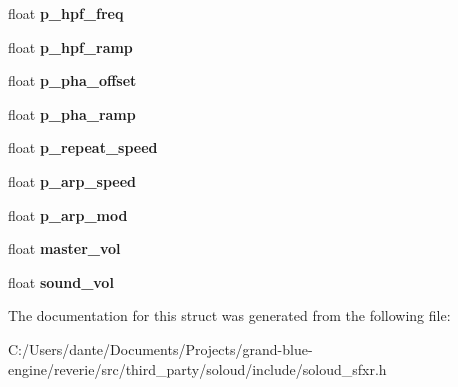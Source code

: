 \begin{DoxyCompactItemize}
float {\bfseries p\+\_\+hpf\+\_\+freq}
\item 
\mbox{\label{struct_so_loud_1_1_sfxr_params_ac6a93a91c96054caa661ca8a69849cd3}} 
float {\bfseries p\+\_\+hpf\+\_\+ramp}
\item 
\mbox{\label{struct_so_loud_1_1_sfxr_params_a77407eaea01a9729edd77601935ad630}} 
float {\bfseries p\+\_\+pha\+\_\+offset}
\item 
\mbox{\label{struct_so_loud_1_1_sfxr_params_aaa118d49465911a42896292d5dd9d38f}} 
float {\bfseries p\+\_\+pha\+\_\+ramp}
\item 
\mbox{\label{struct_so_loud_1_1_sfxr_params_a8e264eb463bb0d54278a7523e05f92c7}} 
float {\bfseries p\+\_\+repeat\+\_\+speed}
\item 
\mbox{\label{struct_so_loud_1_1_sfxr_params_a818682d30a2f7f185cd21d2e162dbad5}} 
float {\bfseries p\+\_\+arp\+\_\+speed}
\item 
\mbox{\label{struct_so_loud_1_1_sfxr_params_a0d98f475455a59d71a3aed2092a646e5}} 
float {\bfseries p\+\_\+arp\+\_\+mod}
\item 
\mbox{\label{struct_so_loud_1_1_sfxr_params_a914028741afd880475085953ae2872a3}} 
float {\bfseries master\+\_\+vol}
\item 
\mbox{\label{struct_so_loud_1_1_sfxr_params_aa0ed234579b29fa59b923f3ee0849761}} 
float {\bfseries sound\+\_\+vol}
\end{DoxyCompactItemize}


The documentation for this struct was generated from the following file\+:\begin{DoxyCompactItemize}
\item 
C\+:/\+Users/dante/\+Documents/\+Projects/grand-\/blue-\/engine/reverie/src/third\+\_\+party/soloud/include/soloud\+\_\+sfxr.\+h\end{DoxyCompactItemize}
